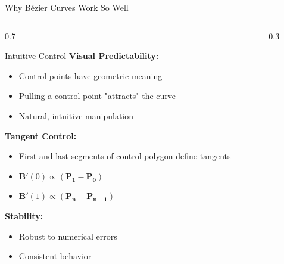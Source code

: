 \begin{frame}{Why Bézier Curves Work So Well}
  \begin{columns}
    \begin{column}{0.7\textwidth}
      \begin{conceptbox}{Intuitive Control}
        \footnotesize
        \textbf{Visual Predictability:}
        \begin{itemize}
          \item Control points have geometric meaning
          \item Pulling a control point "attracts" the curve
          \item Natural, intuitive manipulation
        \end{itemize}

        \vspace{0.3cm}
        \textbf{Tangent Control:}
        \begin{itemize}
          \item First and last segments of control polygon define tangents
          \item $\mathbf{B}'(0) \propto (\mathbf{P_1} - \mathbf{P_0})$
          \item $\mathbf{B}'(1) \propto (\mathbf{P_n} - \mathbf{P_{n-1}})$
        \end{itemize}

        \vspace{0.3cm}
        \textbf{Stability:}
        \begin{itemize}
          \item Robust to numerical errors
          \item Consistent behavior
        \end{itemize}
      \end{conceptbox}
    \end{column}
    \begin{column}{0.3\textwidth}
      \begin{center}
\end{center}
\end{column}
\end{columns}
\end{frame}
